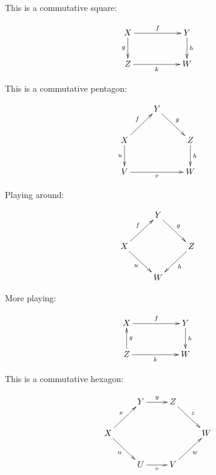 \documentclass[a4paper,10pt]{article}
\numberwithin{equation}{section}
\begin{document}
This is a commutative square:

\begin{equation}
\xymatrix{
X \ar[rr]^-{f} \ar[d]_-{g} && Y \ar[d]^-{h} \\
Z \ar[rr]_-{k} && W}
\end{equation}

This is a commutative pentagon:

\begin{equation}
\xymatrix{
& Y \ar[rd]^-{ g}  & \\
X \ar[ru]^-{f} \ar[d]_-{u} & & Z \ar[d]^-{h} \\
V \ar[rr]_-{v} & & W }
\end{equation}

Playing around:

\begin{equation}
\xymatrix{
& Y \ar[rd]^-{ g}  & \\
X \ar[ru]^-{f} \ar[rd]_-{u} & & Z \ar[ld]^-{h} \\
& W }
\end{equation}

More playing:

\begin{equation}
\xymatrix{
X \ar[rr]^-{f}  && Y \ar[d]^-{h} \\
Z \ar[rr]_-{k} \ar[u]_-{g} && W}
\end{equation}


This is a commutative hexagon:

\begin{equation}
\xymatrix{
& Y \ar[r]^-{y} & Z \ar[rd]^-{z} & \\
X \ar[ru]^-{x} \ar[rd]_-{u} & & & W \\
& U \ar[r]_-{v} & V \ar[ru]_-{w} &}
\end{equation}
\end{document}
